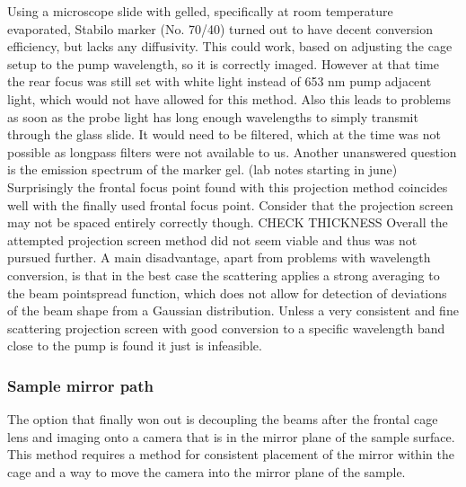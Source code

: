 \documentclass[twoside,openright]{scrreprt}
\begin{document}
Using a microscope slide with gelled, specifically at room temperature evaporated, Stabilo marker (No. 70/40) turned out to have decent conversion efficiency, but lacks any diffusivity. This could work, based on adjusting the cage setup to the pump wavelength, so it is correctly imaged. However at that time the rear focus was still set with white light instead of 653 nm pump adjacent light, which would not have allowed for this method. Also this leads to problems as soon as the probe light has long enough wavelengths to simply transmit through the glass slide. It would need to be filtered, which at the time was not possible as longpass filters were not available to us. Another unanswered question is the emission spectrum of the marker gel. (lab notes  starting in june)\\
Surprisingly the frontal focus point found with this projection method coincides well with the finally used frontal focus point. Consider that the projection screen may not be spaced entirely correctly though. CHECK THICKNESS
Overall the attempted projection screen method did not seem viable and thus was not pursued further. A main disadvantage, apart from problems with wavelength conversion, is that in the best case the scattering applies a strong averaging to the beam pointspread function, which does not allow for detection of deviations of the beam shape from a Gaussian distribution. Unless a very consistent and fine scattering projection screen with good conversion to a specific wavelength band close to the pump is found it just is infeasible.


\subsubsection{Sample mirror path}\label{SampleMirrorCamera}
The option that finally won out is decoupling the beams after the frontal cage lens and imaging onto a camera that is in the mirror plane of the sample surface. This method requires a method for consistent placement of the mirror within the cage and a way to move the camera into the mirror plane of the sample.\\
\end{document}
